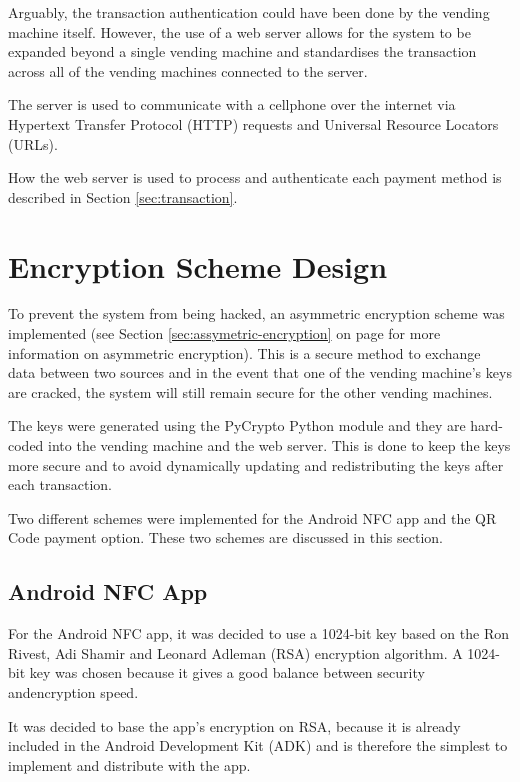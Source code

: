 Arguably, the transaction authentication could have been done by the vending
machine itself.
However, the use of a web server allows for the system to be expanded beyond a
single vending machine and standardises the transaction across all of the
vending machines connected to the server.

The server is used to communicate with a cellphone over the internet via
Hypertext Transfer Protocol (HTTP) requests and Universal Resource Locators
(URLs).

How the web server is used to process and authenticate each payment method is
described in Section \ref{sec:transaction}.
 
\section{Encryption Scheme Design}

To prevent the system from being hacked, an asymmetric encryption scheme was
implemented (see Section \ref{sec:assymetric-encryption} on page
\pageref{sec:assymetric-encryption} for more information on asymmetric encryption).
This is a secure method to exchange data between two sources and in the event that
one of the vending machine's keys are cracked, the system will still remain
secure for the other vending machines.

The keys were generated using the PyCrypto Python module and they are hard-coded
into the vending machine and the web server. This is done to keep the keys more
secure and to avoid dynamically updating and redistributing the keys after each
transaction.

Two different schemes were implemented for the Android NFC app and the QR Code
payment option. These two schemes are discussed in this section.

\subsection{Android NFC App}

For the Android NFC app, it was decided to use a 1024-bit key based on the Ron
Rivest, Adi Shamir and Leonard Adleman (RSA) encryption algorithm. A 1024-bit key was chosen because it gives a good balance between security andencryption speed. 

It was decided to base the app's encryption on RSA, because it is already included in the Android
Development Kit (ADK) and is therefore the simplest to implement and distribute
with the app. 

